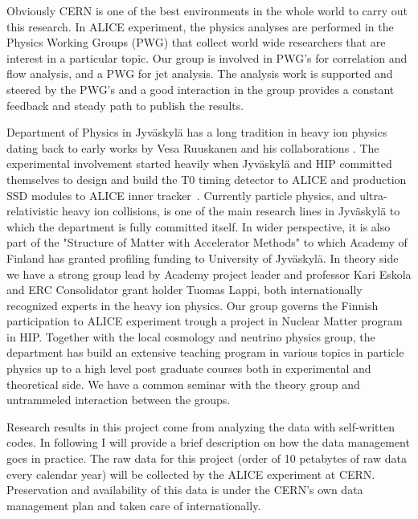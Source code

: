 Obviously CERN is one of the best environments in the whole world to carry out this research. In ALICE experiment, the physics analyses are performed in the Physics Working Groups (PWG) that collect world wide researchers that are interest in a particular topic. Our group is involved in PWG's for correlation and flow analysis, and a PWG for jet analysis. The analysis work is supported and steered by the PWG's and a good interaction in the group provides a constant feedback and steady path to publish the results.

Department of Physics in Jyv\"askyl\"a has a long tradition in heavy ion physics dating back to early works by Vesa Ruuskanen and his collaborations \cite{VonGersdorff:1986tqh}. The experimental involvement started heavily when Jyv\"askyl\"a and HIP committed themselves to design and build the T0 timing detector to ALICE and production SSD modules to ALICE inner tracker~\cite{Dellacasa:1999kf}. Currently particle physics, and ultra-relativistic heavy ion collisions, is one of the main research lines in Jyv\"askyl\"a to which the department is fully committed itself. In wider perspective, it is also part of the "Structure of Matter with Accelerator Methods" to which Academy of Finland has granted profiling funding to University of Jyv\"askyl\"a. In theory side we have a strong group lead by Academy project leader and professor Kari Eskola and ERC Consolidator grant holder Tuomas Lappi, both internationally recognized experts in the heavy ion physics. Our group governs the Finnish participation to ALICE experiment trough a project in Nuclear Matter program in HIP. Together with the local cosmology and neutrino physics group, the department has build an extensive teaching program in various topics in particle physics up to a high level post graduate courses both in experimental and theoretical side. We have a common seminar with the theory group and untrammeled interaction between the groups.

Research results in this project come from analyzing the data with self-written codes. In following I will provide a brief description on how the data management goes in practice. 
The raw data for this project (order of 10 petabytes of raw data every calendar year) will be collected by the ALICE experiment at CERN. 
Preservation and availability of this data is under the CERN's own data management plan and taken care of internationally.

